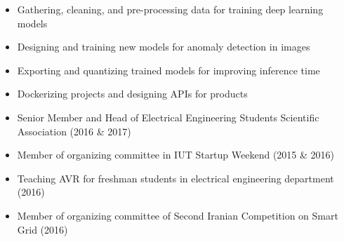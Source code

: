 \documentclass[10pt,a4paper,ragged2e,withhyper]{altacv}
\begin{document}
\vspace*{-1\multicolsep}
\begin{multicols}{2}
\begin{itemize}
\justifying
\item \small{Gathering, cleaning, and pre-processing data for training deep learning models}
\item\small{Designing and training new models for anomaly detection in images}
\item\small{Exporting and quantizing trained models for improving inference time}
\item\small{Dockerizing projects and designing APIs for products}
\end{itemize}
\end{multicols}
\vspace*{-.5\multicolsep}

%



\vspace*{-1\multicolsep}
\begin{multicols}{2}
\begin{itemize}
	\item  \small{Senior Member and Head of Electrical Engineering Students Scientific Association (2016 \& 2017)}
	\item \small{Member of organizing committee in IUT Startup Weekend (2015 \& 2016)}
	\item \small Teaching AVR for freshman students in electrical engineering department (2016)
	\item \small Member of organizing committee of Second Iranian Competition on Smart Grid (2016)
\end{itemize}
\end{multicols}
\end{document}
